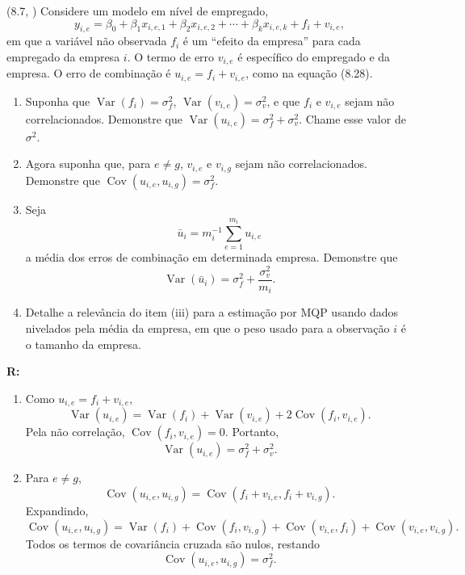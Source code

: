 \documentclass[12pt,letterpaper, onecolumn]{exam}
\renewenvironment{solution}
{\par\noindent\textbf{R:}\enspace\color{blue}}
{\par\color{black}}
\begin{document}
\begin{questions}
\vspace{0.7cm}

\question (8.7, \citep{wooldridge2016}) Considere um modelo em nível de empregado,
\[
y_{i,e} = \beta_0 + \beta_1 x_{i,e,1} + \beta_2 x_{i,e,2} + \cdots + \beta_k x_{i,e,k} + f_i + v_{i,e},
\]
em que a variável não observada \(f_i\) é um ``efeito da empresa'' para cada empregado da empresa \(i\). O termo de erro \(v_{i,e}\) é específico do empregado e da empresa. O erro de combinação é \(u_{i,e} = f_i + v_{i,e}\), como na equação (8.28).
\begin{enumerate}[label=(\roman*)]
    \item Suponha que \(\operatorname{Var}(f_i)=\sigma_f^2\), \(\operatorname{Var}(v_{i,e})=\sigma_v^2\), e que \(f_i\) e \(v_{i,e}\) sejam não correlacionados. Demonstre que \(\operatorname{Var}(u_{i,e})=\sigma_f^2+\sigma_v^2\). Chame esse valor de \(\sigma^2\).
    \item Agora suponha que, para \(e \neq g\), \(v_{i,e}\) e \(v_{i,g}\) sejam não correlacionados. Demonstre que \(\operatorname{Cov}(u_{i,e},u_{i,g})=\sigma_f^2\).
    \item Seja
    \[
    \bar{u}_i = m_i^{-1}\sum_{e=1}^{m_i} u_{i,e}
    \]
    a média dos erros de combinação em determinada empresa. Demonstre que
    \[
    \operatorname{Var}(\bar{u}_i)=\sigma_f^2+\frac{\sigma_v^2}{m_i}.
    \]
    \item Detalhe a relevância do item (iii) para a estimação por MQP usando dados nivelados pela média da empresa, em que o peso usado para a observação \(i\) é o tamanho da empresa.
\end{enumerate}

\begin{solution}
\begin{enumerate}[label=(\roman*)]
    \item Como \(u_{i,e}=f_i+v_{i,e}\),
    \[
    \operatorname{Var}(u_{i,e})
    =
    \operatorname{Var}(f_i)+\operatorname{Var}(v_{i,e})+2\operatorname{Cov}(f_i,v_{i,e}).
    \]
    Pela não correlação, \(\operatorname{Cov}(f_i,v_{i,e})=0\). Portanto,
    \[
    \operatorname{Var}(u_{i,e})=\sigma_f^2+\sigma_v^2.
    \]

    \item Para \(e\neq g\),
    \[
    \operatorname{Cov}(u_{i,e},u_{i,g})
    =
    \operatorname{Cov}(f_i+v_{i,e},f_i+v_{i,g}).
    \]
    Expandindo,
    \[
    \operatorname{Cov}(u_{i,e},u_{i,g})
    =
    \operatorname{Var}(f_i)+\operatorname{Cov}(f_i,v_{i,g})+\operatorname{Cov}(v_{i,e},f_i)+\operatorname{Cov}(v_{i,e},v_{i,g}).
    \]
    Todos os termos de covariância cruzada são nulos, restando
    \[
    \operatorname{Cov}(u_{i,e},u_{i,g})=\sigma_f^2.
    \]


\end{enumerate}
\end{solution}
\end{questions}
\end{document}
